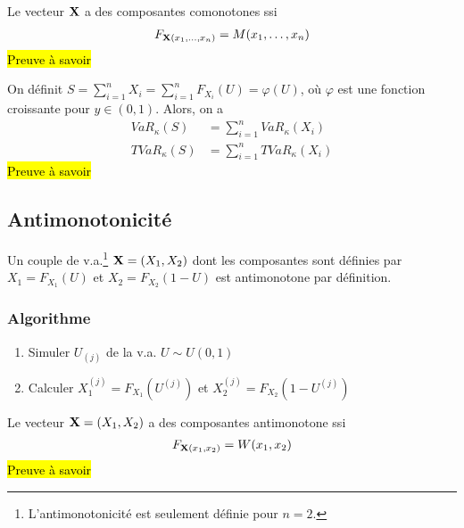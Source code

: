 \documentclass[10pt, french]{article}
\begin{document}
\begin{multicols*}{2}
\begin{definition}
Le vecteur $\mathbf{X}$ a des composantes comonotones ssi
\begin{align*}
F_{\mathbf{X}(x_1, \dots, x_n)} = M(x_1, \dots, x_n)
\end{align*}
\hl{Preuve à savoir}
\end{definition}

\begin{definition}
On définit $S = \sum_{i=1}^{n} X_i = \sum_{i=1}^{n} F_{X_i}(U) = \varphi(U)$, où $\varphi$ est une fonction croissante pour $y \in (0,1)$. Alors, on a
\begin{align*}
VaR_{\kappa}(S) & = \sum_{i=1}^{n} VaR_{\kappa}(X_i) \\
TVaR_{\kappa}(S) & = \sum_{i=1}^{n} TVaR_{\kappa}(X_i)
\end{align*}
\hl{Preuve à savoir}
\end{definition}


\subsection{Antimonotonicité}
Un couple de v.a.\footnote{L'antimonotonicité est seulement définie pour $n=2$.} $\mathbf{X} = (X_1, X_2)$ dont les composantes sont définies par $X_1 = F_{X_1}(U)$ et $X_2 = F_{X_2}(1-U)$ est antimonotone par définition.

\subsubsection{Algorithme}
\begin{enumerate}
\item Simuler $U_{(j)}$ de la v.a. $U \sim U(0,1)$
\item Calculer $X_1^{(j)} = F_{X_1}(U^{(j)})$ et $X_2^{(j)} = F_{X_2}(1 - U^{(j)})$
\end{enumerate}

\begin{definition}
Le vecteur $\mathbf{X} = (X_1, X_2)$ a des composantes antimonotone ssi
\begin{align*}
F_{\mathbf{X}(x_1,x_2)} = W(x_1, x_2)
\end{align*}
\hl{Preuve à savoir}
\end{definition}


\end{multicols*}
\end{document}
